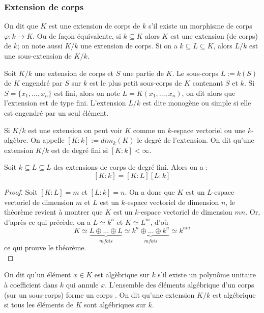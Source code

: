 \documentclass[a4paper]{article} %
\numberwithin{equation}{section}
\begin{document}
\subsubsection{Extension de corps}
\label{defdegext}
On dit que $K$ est une extension de corps de $k$ s'il existe un morphisme de 
corps $\varphi : k \to K$. Ou de façon équivalente, si $k \subseteq K$ alors $K$
est une extension (de corps) de $k$; on note aussi $K/k$ une extension de corps.
Si on a $k\subseteq L \subseteq K$, alors $L/k$ est une sous-extension de
$K/k$.\par
Soit $K/k$ une extension de corps et $S$ une partie de $K$. Le sous-corps $L := 
k(S)$ de $K$ engendré par $S$ sur $k$ est le plus petit sous-corps de $K$ 
contenant $S$ et $k$. Si $S = \lbrace x_1,\dots,x_n \rbrace$ est fini, alors on 
note $L = K(x_1,\dots,x_n)$, on dit alors que l'extension est de type fini. 
L'extension $L/k$ est dite monogène ou simple si elle est engendré par un seul 
élément.\par
Si $K/k$ est une extension on peut voir $K$ comme un $k$-espace vectoriel ou une
$k$-algèbre. On appelle $[K:k] := dim_k(K)$ le degré de l'extension. On dit 
qu'une extension $K/k$ est de degré fini si $[K:k] < \infty$.\par

\begin{thm}
Soit $k \subseteq L \subseteq L$ des extensions de corps de degré fini. Alors on
a :
\[[K:k] = [K:L][L:k]\]
\end{thm}
\begin{proof}
Soit $[K:L] = m$ et $[L:k] = n$. On a donc que $K$ est un $L$-espace vectoriel 
de dimension $m$ et $L$ est un $k$-espace vectoriel de dimension $n$, le 
théorème revient à montrer que $K$ est un $k$-espace vectoriel de dimension 
$mn$. Or, d'après ce qui précède, on a $L \simeq k^n$ et $K \simeq L^m$, d'où
\[K \simeq \underbrace{L \oplus\dots\oplus L}_{m fois}\simeq\underbrace
{k^n\oplus\dots\oplus k^n}_{m fois} \simeq k^{nm}\]
ce qui prouve le théorème.\\
\end{proof}

On dit qu'un élément $x\in K$ est algèbrique sur $k$ s'il existe un polynôme 
unitaire à coefficient dans $k$ qui annule $x$. L'ensemble des éléments 
algébrique d'un corps (sur un sous-corps) forme un corps \cite[p.~64, théorème
1.14]{Per}. On dit qu'une extension $K/k$ est algébrique si tous les éléments 
de $K$ sont algébriques sur $k$.
\end{document}
